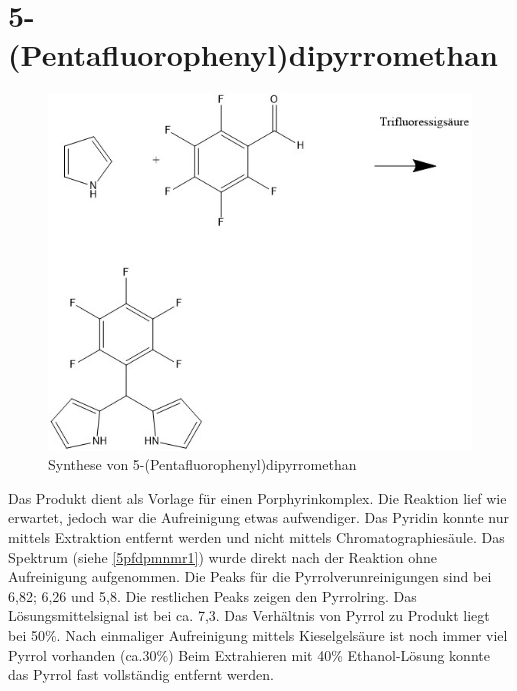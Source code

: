 \section{5-(Pentafluorophenyl)dipyrromethan}
\begin{figure}[!htpb]
\centering
\includegraphics[scale=0.5]{graphics/5-(Pentafluorphenyl)dipyrromethan}
\caption{Synthese von 5-(Pentafluorophenyl)dipyrromethan}
\end{figure}
Das Produkt dient als Vorlage für einen Porphyrinkomplex. Die Reaktion lief wie erwartet, jedoch war die Aufreinigung etwas aufwendiger. Das Pyridin konnte nur mittels Extraktion entfernt werden und nicht mittels Chromatographiesäule. Das Spektrum (siehe \ref{5pfdpmnmr1}) wurde direkt nach der Reaktion ohne Aufreinigung aufgenommen. Die Peaks für die Pyrrolverunreinigungen sind bei 6,82; 6,26 und 5,8. Die restlichen Peaks zeigen den Pyrrolring. Das Lösungsmittelsignal ist bei ca. 7,3. Das Verhältnis von Pyrrol zu Produkt liegt bei 50\%. Nach einmaliger Aufreinigung mittels Kieselgelsäure ist noch immer  viel Pyrrol vorhanden (ca.30\%) Beim Extrahieren mit 40\% Ethanol-Lösung konnte das Pyrrol fast vollständig entfernt werden.
